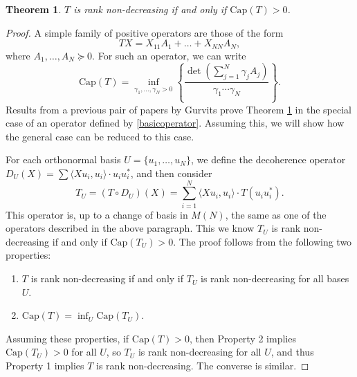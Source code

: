 \documentclass[12pt]{article}
\newtheorem{theorem}{Theorem}
\begin{document}
\begin{theorem}\cite{gurv2004} \label{rankdecreasingcapacitytheorem}
    $T$ is rank non-decreasing if and only if $\text{Cap}(T) > 0$.
\end{theorem}
\begin{proof}
    A simple family of positive operators are those of the form
    \begin{equation} \label{basicoperator}
        TX = X_{11} A_1 + \dots + X_{NN} A_N,
    \end{equation}
    where $A_1,\dots,A_N \succeq 0$. For such an operator, we can write
    \[ \text{Cap}(T) = \inf_{\gamma_1, \dots, \gamma_N > 0} \left\{ \frac{\det \left( \sum_{j = 1}^N \gamma_j A_j \right)}{\gamma_1 \cdots \gamma_N} \right\}. \]
    Results from a previous pair of papers by Gurvits prove Theorem \ref{rankdecreasingcapacitytheorem} in the special case of an operator defined by \eqref{basicoperator}. Assuming this, we will show how the general case can be reduced to this case.

    For each orthonormal basis $U = \{ u_1, \dots, u_N \}$, we define the decoherence operator $D_U(X) = \sum \langle Xu_i, u_i \rangle \cdot u_i u_i^*$, and then consider
    \[ T_U = (T \circ D_U)(X) = \sum_{i = 1}^N \langle Xu_i, u_i \rangle \cdot T(u_i u_i^*). \]
    This operator is, up to a change of basis in $M(N)$, the same as one of the operators described in the above paragraph. This we know $T_U$ is rank non-decreasing if and only if $\text{Cap}(T_U) > 0$. The proof follows from the following two properties:
    \begin{enumerate}
        \item $T$ is rank non-decreasing if and only if $T_U$ is rank non-decreasing for all bases $U$.
        \item $\text{Cap}(T) = \inf_U \text{Cap}(T_U)$.
    \end{enumerate}
    Assuming these properties, if $\text{Cap}(T) > 0$, then Property 2 implies $\text{Cap}(T_U) > 0$ for all $U$, so $T_U$ is rank non-decreasing for all $U$, and thus Property 1 implies $T$ is rank non-decreasing. The converse is similar.


\end{proof}
\end{document}
